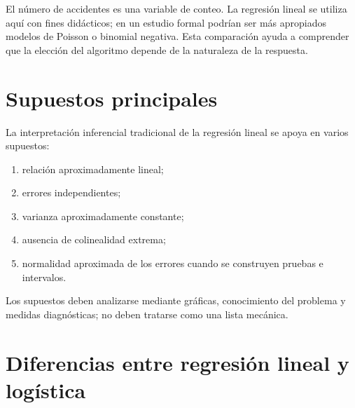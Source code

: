 \documentclass[
  spanish,
  10.5pt,
  letterpaper,
  openany,
  headings=big]{scrbook}
\providecommand{\tightlist}{%
  \setlength{\itemsep}{0pt}\setlength{\parskip}{0pt}}
\begin{document}
\begin{tcolorbox}[enhanced jigsaw, arc=.35mm, bottomrule=.15mm, bottomtitle=1mm, breakable, colback=white, colbacktitle=quarto-callout-warning-color!10!white, colframe=quarto-callout-warning-color-frame, coltitle=black, left=2mm, leftrule=.75mm, opacityback=0, opacitybacktitle=0.6, rightrule=.15mm, title=\textcolor{quarto-callout-warning-color}{\faExclamationTriangle}\hspace{0.5em}{Limitación del ejemplo}, titlerule=0mm, toprule=.15mm, toptitle=1mm]

El número de accidentes es una variable de conteo. La regresión lineal
se utiliza aquí con fines didácticos; en un estudio formal podrían ser
más apropiados modelos de Poisson o binomial negativa. Esta comparación
ayuda a comprender que la elección del algoritmo depende de la
naturaleza de la respuesta.

\end{tcolorbox}

\section{Supuestos principales}\label{supuestos-principales}

La interpretación inferencial tradicional de la regresión lineal se
apoya en varios supuestos:

\begin{enumerate}
\def\labelenumi{\arabic{enumi}.}
\tightlist
\item
  relación aproximadamente lineal;
\item
  errores independientes;
\item
  varianza aproximadamente constante;
\item
  ausencia de colinealidad extrema;
\item
  normalidad aproximada de los errores cuando se construyen pruebas e
  intervalos.
\end{enumerate}

Los supuestos deben analizarse mediante gráficas, conocimiento del
problema y medidas diagnósticas; no deben tratarse como una lista
mecánica.

\section{Diferencias entre regresión lineal y
logística}\label{diferencias-entre-regresiuxf3n-lineal-y-loguxedstica}
\end{document}
